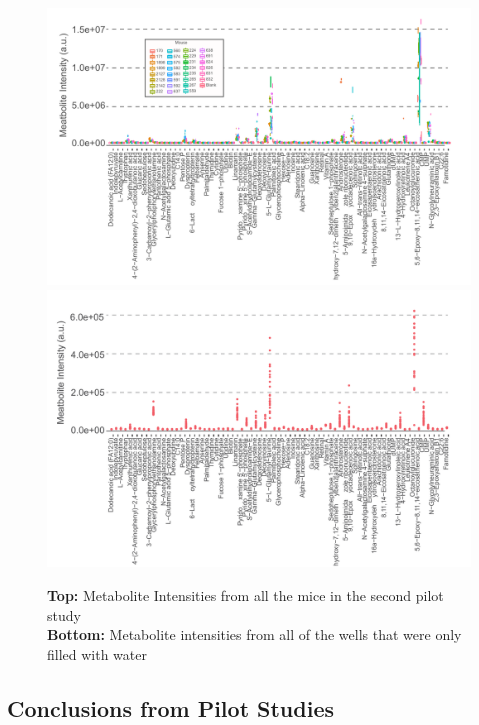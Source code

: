\documentclass[a4paper,11pt,twoside]{book}
\begin{document}
\begin{figure}[hbt!]
	\centering
	\includegraphics[width=1.2\linewidth]{2.Optimizaiton_Figures/TIC_All_Mice_Final}
	\includegraphics[width=1.2\linewidth]{2.Optimizaiton_Figures/TIC_Blank_Final}
	\caption{\textbf{Top:} Metabolite Intensities from all the mice in the second pilot study \\ \textbf{Bottom:} Metabolite intensities from all of the wells that were only filled with water}
	\label{fig:TIC of Mouse Metabolties and Blanks}
\end{figure}
	
	
	
	\subsection*{Conclusions from Pilot Studies}
	
\end{document}
